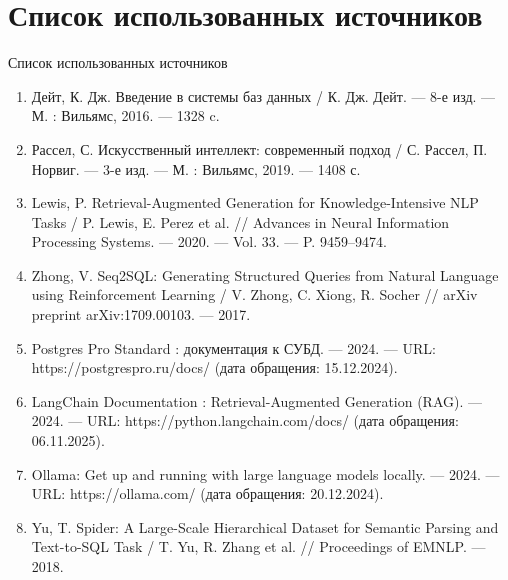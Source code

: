 \documentclass[10pt, aspectratio=169, unicode]{beamer}
\begin{document}
\section{Список использованных источников}

\begin{frame}{Список использованных источников}
    \footnotesize
    \begin{enumerate}
        \item Дейт, К. Дж. Введение в системы баз данных / К. Дж. Дейт. — 8-е изд. — М. : Вильямс, 2016. — 1328 c.
        \item Рассел, С. Искусственный интеллект: современный подход / С. Рассел, П. Норвиг. — 3-е изд. — М. : Вильямс, 2019. — 1408 с.
        
        \item Lewis, P. Retrieval-Augmented Generation for Knowledge-Intensive NLP Tasks / P. Lewis, E. Perez et al. // Advances in Neural Information Processing Systems. — 2020. — Vol. 33. — P. 9459–9474.
        \item Zhong, V. Seq2SQL: Generating Structured Queries from Natural Language using Reinforcement Learning / V. Zhong, C. Xiong, R. Socher // arXiv preprint arXiv:1709.00103. — 2017.
        
        \item Postgres Pro Standard : документация к СУБД. — 2024. — URL: https://postgrespro.ru/docs/ (дата обращения: 15.12.2024).
        \item LangChain Documentation : Retrieval-Augmented Generation (RAG). — 2024. — URL: https://python.langchain.com/docs/ (дата обращения: 06.11.2025).
        \item Ollama: Get up and running with large language models locally. — 2024. — URL: https://ollama.com/ (дата обращения: 20.12.2024).
        
        \item Yu, T. Spider: A Large-Scale Hierarchical Dataset for Semantic Parsing and Text-to-SQL Task / T. Yu, R. Zhang et al. // Proceedings of EMNLP. — 2018.
    \end{enumerate}
\end{frame}
\end{document}
